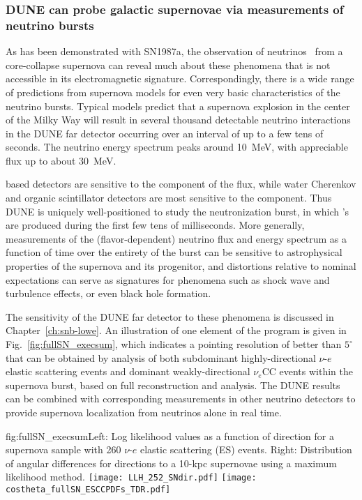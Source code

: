 \subsubsection{DUNE can probe galactic supernovae via measurements of neutrino bursts}

As has been demonstrated with SN1987a, the observation 
of neutrinos~\cite{Bionta:1987qt,Hirata:1987hu} from a 
core-collapse supernova can reveal much about these  
phenomena that is not accessible in its  
electromagnetic signature.  Correspondingly, there is a 
wide range of predictions from supernova models for even 
very basic characteristics of the neutrino bursts.  Typical  
models predict that a supernova explosion in the 
center of the Milky Way will result in several thousand 
detectable neutrino interactions in the DUNE far detector 
occurring over an interval of up to a few tens of seconds.
The neutrino energy spectrum peaks around \SI{10}{MeV}, 
with appreciable flux up to about \SI{30}{MeV}.

\lar based detectors are sensitive to the \nue 
component of the flux, while water Cherenkov and organic 
scintillator detectors are most sensitive to the \anue 
component.  Thus DUNE is uniquely well-positioned to study the 
neutronization burst, in which \nue's are produced during the 
first few tens of milliseconds.  More generally,  
measurements of the (flavor-dependent) neutrino flux and energy 
spectrum as a function of time over the entirety of the burst 
can be sensitive to astrophysical properties of the supernova 
and its progenitor, and distortions relative to nominal 
expectations can serve as signatures for phenomena such 
as shock wave and turbulence effects, or even black hole 
formation.  

The sensitivity of the DUNE far detector to these 
phenomena is discussed in Chapter~\ref{ch:snb-lowe}. An illustration 
of one element of the program is given in Fig.~\ref{fig:fullSN_execsum}, 
which indicates a pointing resolution of better than $5^\circ$ that 
can be obtained by analysis of both subdominant highly-directional $\nu$-$e$ elastic scattering 
events and dominant weakly-directional $\nu_e$CC events within the supernova burst, based
on full reconstruction and analysis. The DUNE results can be 
combined with corresponding measurements in other neutrino detectors to 
provide supernova localization from neutrinos alone in real time.
%
\begin{dunefigure}{fig:fullSN_execsum}{Left: Log
    likelihood values as a function of direction for a
    supernova sample with 260 $\nu$-$e$ elastic scattering (ES) events.  Right: Distribution of angular differences for
    directions to a 10-kpc supernovae using a maximum likelihood
    method.}
  \texttt{[image: LLH\_252\_SNdir.pdf]}
  \texttt{[image: costheta\_fullSN\_ESCCPDFs\_TDR.pdf]}
\end{dunefigure}

